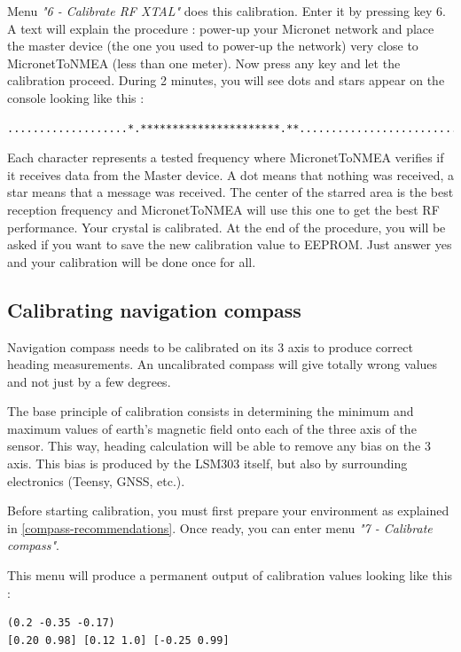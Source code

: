 \documentclass{report}
\begin{document}
Menu \emph{"6 - Calibrate RF XTAL"} does this calibration. Enter it by pressing key 6. A text will explain the procedure : power-up your Micronet network and place the master device (the one you used to power-up the network) very close to MicronetToNMEA (less than one meter). Now press any key and let the calibration proceed. During 2 minutes, you will see dots and stars appear on the console looking like this :

\begin{verbatim}
...................*.**********************.**.....................................
\end{verbatim}

Each character represents a tested frequency where MicronetToNMEA verifies if it receives data from the Master device. A dot means that nothing was received, a star means that a message was received. The center of the starred area is the best reception frequency and MicronetToNMEA will use this one to get the best RF performance. Your crystal is calibrated.
At the end of the procedure, you will be asked if you want to save the new calibration value to EEPROM. Just answer yes and your calibration will be done once for all.

\subsection{Calibrating navigation compass}

Navigation compass needs to be calibrated on its 3 axis to produce correct heading measurements. An uncalibrated compass will give totally wrong values and not just by a few degrees.

The base principle of calibration consists in determining the minimum and maximum values of earth's magnetic field onto each of the three axis of the sensor. This way, heading calculation will be able to remove any bias on the 3 axis. This bias is produced by the LSM303 itself, but also by surrounding electronics (Teensy, GNSS, etc.).

Before starting calibration, you must first prepare your environment as explained in \ref{compass-recommendations}. Once ready, you can enter menu \emph{"7 - Calibrate compass"}.

This menu will produce a permanent output of calibration values looking like this :

\begin{verbatim}
(0.2 -0.35 -0.17)
[0.20 0.98] [0.12 1.0] [-0.25 0.99]
\end{verbatim}
\end{document}
